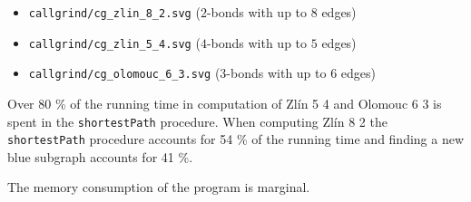 \begin{itemize}
	\item \lstinline|callgrind/cg_zlin_8_2.svg| ($2$-bonds with up to $8$ edges)
	\item \lstinline|callgrind/cg_zlin_5_4.svg| ($4$-bonds with up to $5$ edges)
	\item \lstinline|callgrind/cg_olomouc_6_3.svg| ($3$-bonds with up to $6$ edges)
\end{itemize}

Over 80 \% of the running time in computation of Zlín 5 4 and Olomouc 6 3 is spent in the \lstinline|shortestPath| procedure. When computing Zlín 8 2 the \lstinline|shortestPath| procedure accounts for 54 \% of the running time and finding a new blue subgraph accounts for 41 \%.

The memory consumption of the program is marginal.
